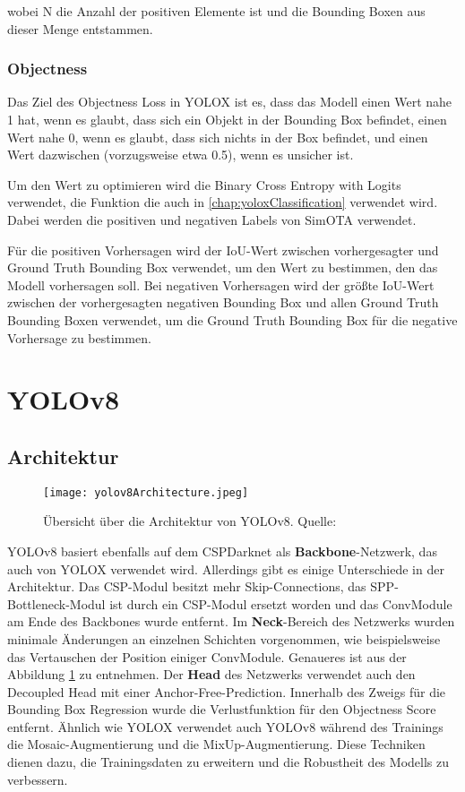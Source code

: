 wobei N die Anzahl der positiven Elemente ist und die Bounding Boxen aus dieser Menge entstammen. \cite{yoloxExplanationHowWorks}

\subsubsection{Objectness}
Das Ziel des Objectness Loss in YOLOX ist es, dass das Modell einen Wert nahe 1 hat, wenn es glaubt, dass sich ein Objekt in der Bounding Box befindet, einen Wert nahe 0, wenn es glaubt, dass sich nichts in der Box befindet, und einen Wert dazwischen (vorzugsweise etwa 0.5), wenn es unsicher ist.

Um den Wert zu optimieren wird die Binary Cross Entropy with Logits verwendet, die Funktion die auch in \ref{chap:yoloxClassification} verwendet wird. Dabei werden die positiven und negativen Labels von SimOTA verwendet.

Für die positiven Vorhersagen wird der IoU-Wert zwischen vorhergesagter und Ground Truth Bounding Box verwendet, um den Wert zu bestimmen, den das Modell vorhersagen soll. Bei negativen Vorhersagen wird der größte IoU-Wert zwischen der vorhergesagten negativen Bounding Box und allen Ground Truth Bounding Boxen verwendet, um die Ground Truth Bounding Box für die negative Vorhersage zu bestimmen. \cite{yoloxExplanationHowWorks}


\section{YOLOv8}\label{chap:yolov8}
\subsection{Architektur}
\begin{figure}[h]
	\centering
	\texttt{[image: yolov8Architecture.jpeg]}
	\caption[Übersicht über die Architektur von YOLOv8]{Übersicht über die Architektur von YOLOv8. Quelle: \cite{yoloArchitecture}}
	\label{fig:yolov8Architecture}
\end{figure}

YOLOv8 basiert ebenfalls auf dem CSPDarknet als \textbf{Backbone}-Netzwerk, das auch von YOLOX verwendet wird. Allerdings gibt es einige Unterschiede in der Architektur. Das CSP-Modul besitzt mehr Skip-Connections, das SPP-Bottleneck-Modul ist durch ein CSP-Modul ersetzt worden und das ConvModule am Ende des Backbones wurde entfernt. Im \textbf{Neck}-Bereich des Netzwerks wurden minimale Änderungen an einzelnen Schichten vorgenommen, wie beispielsweise das Vertauschen der Position einiger ConvModule. Genaueres ist aus der Abbildung \ref{fig:yolov8Architecture} zu entnehmen.
Der \textbf{Head} des Netzwerks verwendet auch den Decoupled Head mit einer Anchor-Free-Prediction. Innerhalb des Zweigs für die Bounding Box Regression wurde die Verlustfunktion für den Objectness Score entfernt. Ähnlich wie YOLOX verwendet auch YOLOv8 während des Trainings die Mosaic-Augmentierung und die MixUp-Augmentierung. Diese Techniken dienen dazu, die Trainingsdaten zu erweitern und die Robustheit des Modells zu verbessern. \cite{yolov8ModelExplanation}

